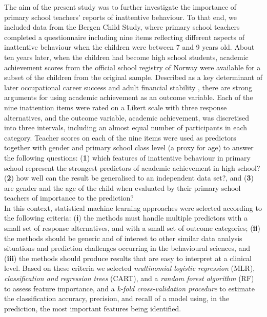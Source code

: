 \documentclass[10pt,letterpaper]{article}
\begin{document}
The aim of the present study was to further investigate the importance of primary school teachers' reports of inattentive behaviour. 
To that end, we included data from the Bergen Child Study, where primary school teachers completed a questionnaire including nine items 
reflecting different aspects of inattentive behaviour when the children were between 7 and 9 years old. About ten years later, when the children 
had become high school students, academic achievement scores from the official school registry of Norway were available for a subset of 
the children from the original sample. Described as a key determinant of later occupational career success and adult
financial stability \cite{Fried2016}, there are strong arguments for using academic achievement as an outcome variable. Each of the nine inattention items were rated on a 
Likert scale with three response alternatives, and the outcome variable, academic achievement, was discretised into three intervals, including an almost equal number 
of participants in each category.  Teacher scores on each of the nine items were used as predictors together with gender and primary school class level (a proxy for age) 
to answer the following questions: ({\bf1}) which features of inattentive behaviour in primary school represent the strongest predictors of academic achievement in 
high school? ({\bf 2}) how well can the result be generalised to an independent data set?, and ({\bf3}) are gender and the age of the child 
when evaluated by their primary school teachers of importance to the prediction?  \\ 

In this context, statistical machine learning approaches were selected according to the following criteria: ({\bf i}) the methods must handle multiple predictors with a small set of response alternatives, and with a small set of outcome categories; ({\bf ii}) the methods should be generic and of interest to other similar data analysis situations  
and prediction challenges  occurring in the behavioural sciences, and ({\bf iii}) the methods should produce results that are easy to interpret at a clinical level. 
Based on these criteria we selected {\em multinomial logistic regression} (MLR), {\em classification and regression trees} (CART), and a {\em random forest algorithm} (RF) to assess feature importance, and a {\em k-fold cross-validation procedure} to estimate the classification accuracy,  precision, and recall of a model using, in the prediction, the most important features being identified. 
\end{document}
